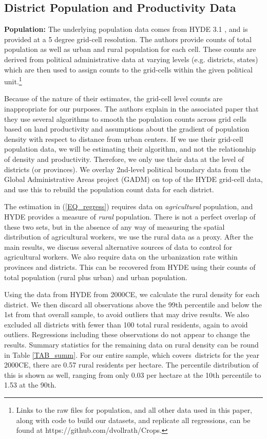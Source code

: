 \documentclass[11pt]{article}
\begin{document}
\subsection{District Population and Productivity Data}

\noindent\textbf{Population:} The underlying population data comes from HYDE 3.1 \citep{hyde31}, and is provided at a 5 degree grid-cell resolution. The authors provide counts of total population as well as urban and rural population for each cell. These counts are derived from political administrative data at varying levels (e.g. districts, states) which are then used to assign counts to the grid-cells within the given political unit.\footnote{Links to the raw files for population, and all other data used in this paper, along with code to build our datasets, and replicate all regressions, can be found at https://github.com/dvollrath/Crops.}

Because of the nature of their estimates, the grid-cell level counts are inappropriate for our purposes. The authors explain in the associated paper that they use several algorithms to smooth the population counts across grid cells based on land productivity and assumptions about the gradient of population density with respect to distance from urban centers. If we use their grid-cell population data, we will be estimating their algorithm, and not the relationship of density and productivity. Therefore, we only use their data at the level of districts (or provinces). We overlay 2nd-level political boundary data from the Global Administrative Areas project (GADM) on top of the HYDE grid-cell data, and use this to rebuild the population count data for each district.

The estimation in (\ref{EQ_regress}) requires data on \textit{agricultural} population, and HYDE provides a measure of \textit{rural} population. There is not a perfect overlap of these two sets, but in the absence of any way of measuring the spatial distribution of agricultural workers, we use the rural data as a proxy. After the main results, we discuss several alternative sources of data to control for agricultural workers. We also require data on the urbanization rate within provinces and districts. This can be recovered from HYDE using their counts of total population (rural plus urban) and urban population.

Using the data from HYDE from 2000CE, we calculate the rural density for each district. We then discard all observations above the 99th percentile and below the 1st from that overall sample, to avoid outliers that may drive results. We also excluded all districts with fewer than 100 total rural residents, again to avoid outliers. Regressions including these observations do not appear to change the results. Summary statistics for the remaining data on rural density can be round in Table \ref{TAB_summ}. For our entire sample, which covers\districts \ districts for the year 2000CE, there are 0.57 rural residents per hectare. The percentile distribution of this is shown as well, ranging from only 0.03 per hectare at the 10th percentile to 1.53 at the 90th. 
\end{document}

